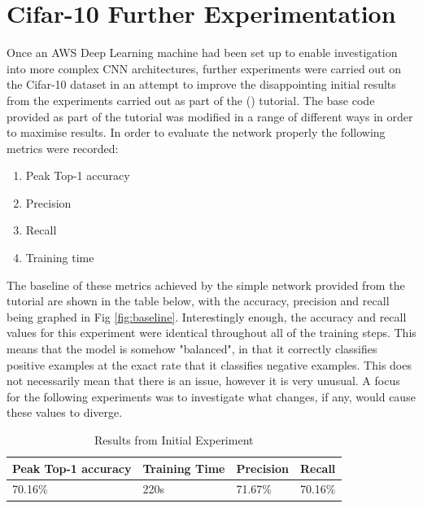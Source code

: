 \documentclass[12pt]{report}
\begin{document}
\chapter{Cifar-10 Further Experimentation}
\begin{flushleft}
Once an AWS Deep Learning machine had been set up to enable investigation into more complex CNN architectures, further experiments were carried out on the Cifar-10 dataset in an attempt to improve the disappointing initial results from the experiments carried out as part of the (\cite{udemy}) tutorial. The base code provided as part of the tutorial was modified in a range of different ways in order to maximise results. In order to evaluate the network properly the following metrics were recorded:

\begin{enumerate}
  \item Peak Top-1 accuracy
  \item Precision
  \item Recall
  \item Training time
\end{enumerate}

The baseline of these metrics achieved by the simple network provided from the tutorial are shown in the table below, with the accuracy, precision and recall being graphed in Fig \ref{fig:baseline}. Interestingly enough, the accuracy and recall values for this experiment were identical throughout all of the training steps. This means that the model is somehow "balanced", in that it correctly classifies positive examples at the exact rate that it classifies negative examples. This does not necessarily mean that there is an issue, however it is very unusual. A focus for the following experiments was to investigate what changes, if any, would cause these values to diverge.
\end{flushleft}

\vspace{0.5cm}
\begin{table}[ht!]
\begin{tabular}{llll}
\\ \hline
\multicolumn{1}{|l|}{Peak Top-1 accuracy} & \multicolumn{1}{l|}{Training Time} & \multicolumn{1}{l|}{Precision} & \multicolumn{1}{l|}{Recall}  \\ \hline
\multicolumn{1}{|l|}{70.16\%}             & \multicolumn{1}{l|}{220s}          & \multicolumn{1}{l|}{71.67\%}   & \multicolumn{1}{l|}{70.16\%} \\ \hline
\end{tabular}
\caption{Results from Initial Experiment}
\end{table}
\end{document}
